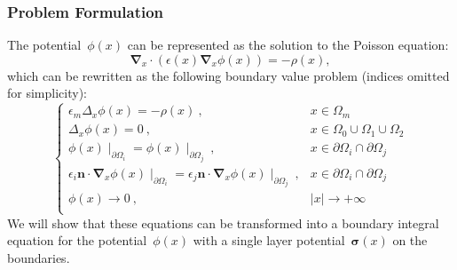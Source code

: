 \documentclass{beamer}
\newcommand{\M}[1]{\boldsymbol{#1}} %
\newcommand{\abs}[1]{\left|#1\right|} %
\newcommand{\grad}{\M{\nabla}} %
\begin{document}
\begin{frame}
	\frametitle{Problem Formulation}

    The potential~$\phi(x)$ can be represented as the solution to the Poisson equation:
    \begin{equation}\label{eq:poisson-origin}
        \grad_{x} \cdot \left( \epsilon(x) \grad_{x} \phi(x) \right) = - \rho(x),
    \end{equation}
    which can be rewritten as the following boundary value problem (indices omitted for simplicity):
    \begin{equation}
        \begin{cases}
            \epsilon_m \Delta_{x} \phi(x) = - \rho(x)~, & x \in \Omega_m \\
            \Delta_{x} \phi(x) = 0~, & x \in \Omega_0 \cup \Omega_1 \cup \Omega_2 \\
            \phi(x)\mid_{\partial \Omega_i} = \phi(x)\mid_{\partial \Omega_j}~, & x \in \partial \Omega_i \cap \partial \Omega_j \\
            \epsilon_i \mathbf{n} \cdot \grad_{x} \phi(x)\mid_{\partial \Omega_i} = \epsilon_j \mathbf{n} \cdot \grad_{x} \phi(x)\mid_{\partial \Omega_j}~, & x \in \partial \Omega_i \cap \partial \Omega_j \\
            \phi(x) \to 0~, & \abs{x} \to + \infty \\
        \end{cases}
    \end{equation}
    We will show that these equations can be transformed into a boundary integral equation for the potential~$\phi(x)$ with a single layer potential~$\mathbf{\sigma}(x)$ on the boundaries.

\end{frame}
\end{document}
